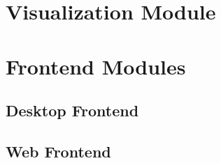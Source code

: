 \section{Visualization Module}
\label{sec:visualization-module}

\section{Frontend Modules}
\label{sec:frontend-modules}

\subsection{Desktop Frontend}
\label{sec:desktop-frontend}

\subsection{Web Frontend}
\label{sec:web-frontend}






